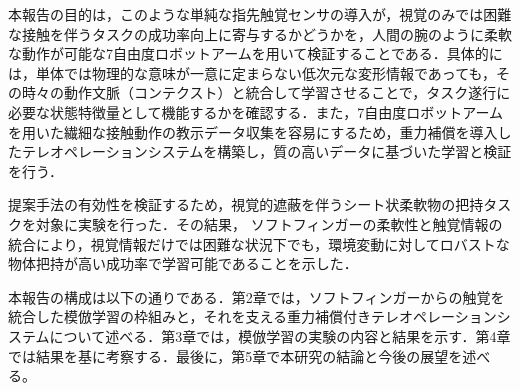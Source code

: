 本報告の目的は，このような単純な指先触覚センサの導入が，視覚のみでは困難な接触を伴うタスクの成功率向上に寄与するかどうかを，人間の腕のように柔軟な動作が可能な7自由度ロボットアーム\cite{rosenHumanArmKinematics2005}を用いて検証することである．具体的には，単体では物理的な意味が一意に定まらない低次元な変形情報であっても，その時々の動作文脈（コンテクスト）と統合して学習させることで，タスク遂行に必要な状態特徴量として機能するかを確認する．また，7自由度ロボットアームを用いた繊細な接触動作の教示データ収集を容易にするため，重力補償を導入したテレオペレーションシステムを構築し，質の高いデータに基づいた学習と検証を行う．



提案手法の有効性を検証するため，視覚的遮蔽を伴うシート状柔軟物の把持タスクを対象に実験を行った．その結果，
ソフトフィンガーの柔軟性と触覚情報の統合により，視覚情報だけでは困難な状況下でも，環境変動に対してロバストな物体把持が高い成功率で学習可能であることを示した．\par
本報告の構成は以下の通りである．第2章では，ソフトフィンガーからの触覚を統合した模倣学習の枠組みと，それを支える重力補償付きテレオペレーションシステムについて述べる．第3章では，模倣学習の実験の内容と結果を示す．第4章では結果を基に考察する．最後に，第5章で本研究の結論と今後の展望を述べる。
\par